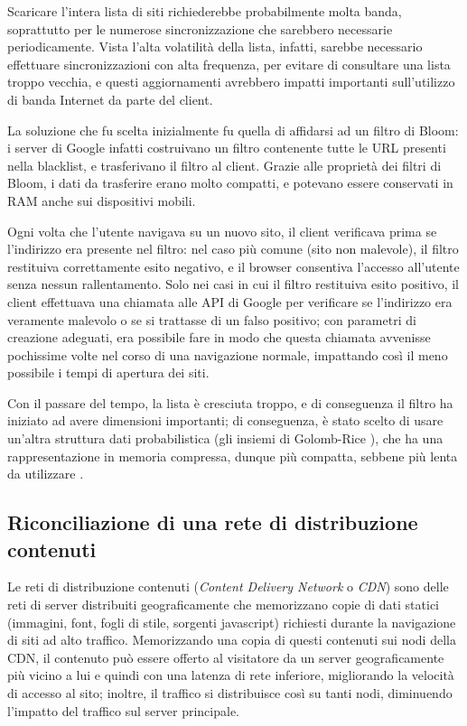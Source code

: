 Scaricare l'intera lista di siti richiederebbe probabilmente molta banda, soprattutto per le
numerose sincronizzazione che sarebbero necessarie periodicamente. Vista l'alta volatilità della
lista, infatti, sarebbe necessario effettuare sincronizzazioni con alta frequenza, per evitare di
consultare una lista troppo vecchia, e questi aggiornamenti avrebbero impatti importanti
sull'utilizzo di banda Internet da parte del client.

La soluzione che fu scelta inizialmente fu quella di affidarsi ad un filtro di Bloom: i server
di Google infatti costruivano un filtro contenente tutte le URL presenti nella blacklist, e
trasferivano il filtro al client. Grazie alle proprietà dei filtri di Bloom, i dati da trasferire
erano molto compatti, e potevano essere conservati in RAM anche sui dispositivi mobili.

Ogni volta che l'utente navigava su un nuovo sito, il client verificava prima se l'indirizzo era
presente nel filtro: nel caso più comune (sito non malevole), il filtro restituiva correttamente
esito negativo, e il browser consentiva l'accesso all'utente senza nessun rallentamento. Solo nei
casi in cui il filtro restituiva esito positivo, il client effettuava una chiamata alle API di
Google per verificare se l'indirizzo era veramente malevolo o se si trattasse di un falso positivo;
con parametri di creazione adeguati, era possibile fare in modo che questa chiamata avvenisse
pochissime volte nel corso di una navigazione normale, impattando così il meno possibile i tempi
di apertura dei siti.

Con il passare del tempo, la lista è cresciuta troppo, e di conseguenza il filtro ha iniziato
ad avere dimensioni importanti; di conseguenza, è stato scelto di usare un'altra struttura dati
probabilistica (gli insiemi di Golomb-Rice \cite{golomb}), che ha una rappresentazione in memoria
compressa, dunque più compatta, sebbene più lenta da utilizzare \cite{golomb-safebrowsing}. 

\subsection{Riconciliazione di una rete di distribuzione contenuti}
\label{sec:bloomcdn}

Le reti di distribuzione contenuti (\emph{Content Delivery Network} o \emph{CDN}) sono delle reti
di server distribuiti geograficamente che memorizzano copie di dati statici (immagini, font, 
fogli di stile, sorgenti javascript) richiesti durante la navigazione di siti ad alto traffico. 
Memorizzando una copia di questi contenuti sui nodi della CDN, il contenuto può essere offerto
al visitatore da un server geograficamente più vicino a lui e quindi con una latenza di rete
inferiore, migliorando la velocità di accesso al sito; inoltre, il traffico si distribuisce
così su tanti nodi, diminuendo l'impatto del traffico sul server principale.

